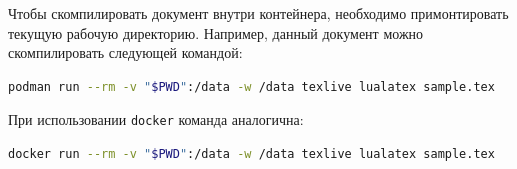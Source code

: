 \documentclass[a4paper, 14pt]{extarticle}
\begin{document}
Чтобы скомпилировать документ внутри контейнера, необходимо примонтировать 
текущую рабочую директорию. Например, данный документ можно скомпилировать следующей командой:
\begin{lstlisting}[language=bash]
podman run --rm -v "$PWD":/data -w /data texlive lualatex sample.tex
\end{lstlisting}

При использовании \texttt{docker} команда аналогична:
\begin{lstlisting}[language=bash]
docker run --rm -v "$PWD":/data -w /data texlive lualatex sample.tex
\end{lstlisting}
\end{document}
